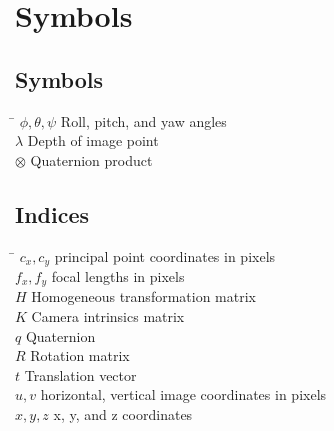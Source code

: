 \chapter*{Symbols}
\label{chapter:symbols}

\section*{Symbols}

\begin{tabbing}
 \hspace*{1.6cm} \= \kill
  $\phi, \theta, \psi$ \> Roll, pitch, and yaw angles \\[0.5ex] 					
  $\lambda$ \> Depth of image point \\[0.5ex]
  $\otimes$ \> Quaternion product \\[0.5ex]
\end{tabbing}

\section*{Indices}
\begin{tabbing}
  \hspace*{1.6cm}  \= \kill
  $c_x, c_y$ \> principal point coordinates in pixels \\[0.5ex]
  $f_x, f_y$ \> focal lengths in pixels \\[0.5ex]
  $H$ \> Homogeneous transformation matrix \\[0.5ex]
  $K$ \> Camera intrinsics matrix \\[0.5ex]
  $q$ \> Quaternion \\[0.5ex]
  $R$ \> Rotation matrix \\[0.5ex]
  $t$ \> Translation vector \\[0.5ex]
  $u, v$ \> horizontal, vertical image coordinates in pixels \\[0.5ex]
  $x, y, z$ \> x, y, and z coordinates \\[0.5ex]
\end{tabbing}

